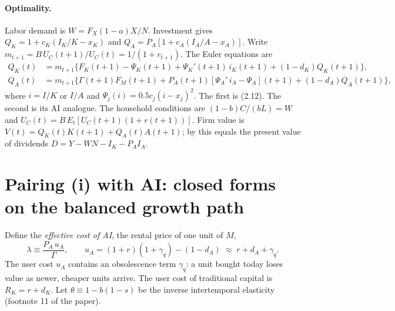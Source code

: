 \documentclass[11pt]{article}
\begin{document}
\paragraph{Optimality.} Labor demand is $W=F_X(1-a)X/N$. Investment gives
$Q_K = 1+c_K(I_K/K-x_K)$ and $Q_A = P_A[1+c_A(I_A/A-x_A)]$. Write
$m_{t+1}=B\,U_C(t+1)/U_C(t)=1/(1+r_{t+1})$. The Euler equations are
\begin{align}
Q_K(t) &= m_{t+1}\big\{F_K(t+1) - \Psi_K(t+1) + \Psi_K'(t+1)\,i_K(t+1) + (1-d_K)Q_K(t+1)\big\},\\
Q_A(t) &= m_{t+1}\big\{\Gamma(t+1)F_M(t+1) + P_A(t+1)[\Psi_A'\,i_A-\Psi_A](t+1) + (1-d_A)Q_A(t+1)\big\},
\end{align}
where $i=I/K$ or $I/A$ and $\Psi_j(i)=0.5c_j(i-x_j)^2$. The first is (2.12). The second
is its AI analogue. The household conditions are
$(1-b)C/(bL)=W$ and $U_C(t)=B\,E_t[U_C(t+1)(1+r(t+1))]$.
Firm value is $V(t)=Q_K(t)K(t+1)+Q_A(t)A(t+1)$; by \citet{hayashi1982} this equals the present value of
dividends $D=Y-WN-I_K-P_AI_A$.

\section{Pairing (i) with AI: closed forms on the balanced growth path}

Define the \emph{effective cost of AI}, the rental price of one unit of $M$,
\begin{equation}
\lambda \equiv \frac{P_A\,u_A}{\Gamma},\qquad u_A = (1+r)(1+\gamma_q) - (1-d_A)\;\approx\; r+d_A+\gamma_q .
\end{equation}
The user cost $u_A$ contains an obsolescence term $\gamma_q$: a unit bought today loses
value as newer, cheaper units arrive. The user cost of traditional capital is
$R_K=r+d_K$. Let $\theta \equiv 1-b(1-s)$ be the inverse intertemporal elasticity
(footnote 11 of the paper).
\end{document}

